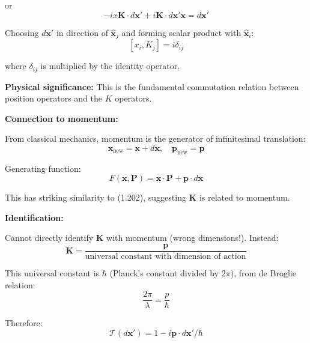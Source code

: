 \documentclass[11pt,a4paper]{article}
\begin{document}
or
\begin{equation}
-ix\mathbf{K} \cdot d\mathbf{x}' + i\mathbf{K} \cdot d\mathbf{x}'\mathbf{x} = d\mathbf{x}'
\tag{1.208}
\end{equation}

Choosing $d\mathbf{x}'$ in direction of $\hat{\mathbf{x}}_j$ and forming scalar product with $\hat{\mathbf{x}}_i$:
\begin{equation}
\boxed{[x_i, K_j] = i\delta_{ij}}
\tag{1.209}
\end{equation}

where $\delta_{ij}$ is multiplied by the identity operator.

\textbf{Physical significance:} This is the fundamental commutation relation between position operators and the $K$ operators.

\textbf{Connection to momentum:}

From classical mechanics, momentum is the generator of infinitesimal translation:
\begin{equation}
\mathbf{x}_{\text{new}} = \mathbf{x} + d\mathbf{x}, \quad \mathbf{p}_{\text{new}} = \mathbf{p}
\tag{1.210}
\end{equation}

Generating function:
\begin{equation}
F(\mathbf{x}, \mathbf{P}) = \mathbf{x} \cdot \mathbf{P} + \mathbf{p} \cdot d\mathbf{x}
\tag{1.211}
\end{equation}

This has striking similarity to (1.202), suggesting $\mathbf{K}$ is related to momentum.

\textbf{Identification:}

Cannot directly identify $\mathbf{K}$ with momentum (wrong dimensions!). Instead:
\begin{equation}
\boxed{\mathbf{K} = \frac{\mathbf{p}}{\text{universal constant with dimension of action}}}
\tag{1.212}
\end{equation}

This universal constant is $\hbar$ (Planck's constant divided by $2\pi$), from de Broglie relation:
\begin{equation}
\frac{2\pi}{\lambda} = \frac{p}{\hbar}
\tag{1.213}
\end{equation}

Therefore:
\begin{equation}
\boxed{\mathcal{T}(d\mathbf{x}') = 1 - i\mathbf{p} \cdot d\mathbf{x}'/\hbar}
\tag{1.214}
\end{equation}
\end{document}
